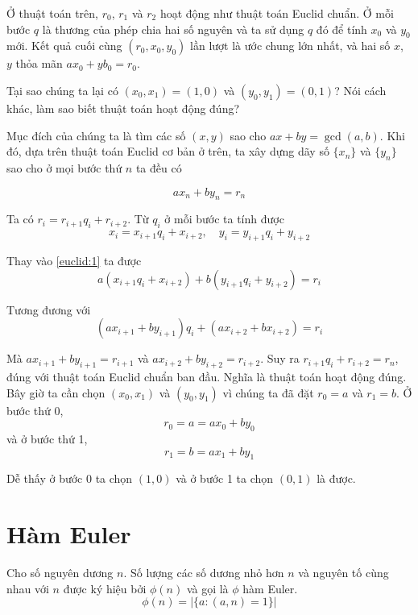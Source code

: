 Ở thuật toán trên, $r_0$, $r_1$ và $r_2$ hoạt động như thuật toán Euclid chuẩn. Ở mỗi bước $q$ là thương của phép chia hai số nguyên và ta sử dụng $q$ đó để tính $x_0$ và $y_0$ mới. Kết quả cuối cùng $(r_0, x_0, y_0)$ lần lượt là ước chung lớn nhất, và hai số $x$, $y$ thỏa mãn $a x_0 + y b_0 = r_0$.

Tại sao chúng ta lại có $(x_0, x_1) = (1, 0)$ và $(y_0, y_1) = (0, 1)$? Nói cách khác, làm sao biết thuật toán  hoạt động đúng?

Mục đích của chúng ta là tìm các số $(x, y)$ sao cho $ax + by = \gcd(a, b)$. Khi đó, dựa trên thuật toán Euclid cơ bản ở trên, ta xây dựng dãy số $\{x_n\}$ và $\{y_n\}$ sao cho ở mọi bước thứ $n$ ta đều có

\begin{equation}\label{euclid:1}
    a x_n + b y_n = r_n
\end{equation}

Ta có $r_i = r_{i+1} q_i + r_{i+2}$. Từ $q_i$ ở mỗi bước ta tính được
\begin{equation*}
    x_i = x_{i+1} q_i + x_{i+2}, \quad y_i = y_{i+1} q_i + y_{i+2}
\end{equation*}

Thay vào \ref{euclid:1} ta được
\begin{equation}
    a (x_{i+1} q_i + x_{i+2}) + b (y_{i+1} q_i + y_{i+2}) = r_i
\end{equation}

Tương đương với \[(a x_{i+1} + b y_{i+1}) q_i + (a x_{i+2} + b x_{i+2}) = r_i\]

Mà $a x_{i+1} + b y_{i+1} = r_{i+1}$ và $a x_{i+2} + b y_{i+2} = r_{i+2}$. Suy ra $r_{i+1} q_i + r_{i+2} = r_n$, đúng với thuật toán Euclid chuẩn ban đầu. Nghĩa là thuật toán hoạt động đúng. Bây giờ ta cần chọn $(x_0, x_1)$ và $(y_0, y_1)$ vì chúng ta đã đặt $r_0 = a$ và $r_1 = b$. Ở bước thứ 0, \[r_0 = a = a x_0 + b y_0\] và ở bước thứ 1,
\[r_1 = b = a x_1 + b y_1\]

Dễ thấy ở bước 0 ta chọn $(1, 0)$ và ở bước 1 ta chọn $(0, 1)$ là được.

\section{Hàm Euler}

\begin{definition}
    Cho số nguyên dương $n$. Số lượng các số dương nhỏ hơn $n$ và nguyên tố cùng nhau với $n$ được ký hiệu bởi $\phi(n)$ và gọi là $\phi$ hàm Euler. \[ \phi(n) = \lvert \{ a : (a, n) = 1\} \rvert \]
\end{definition}   

